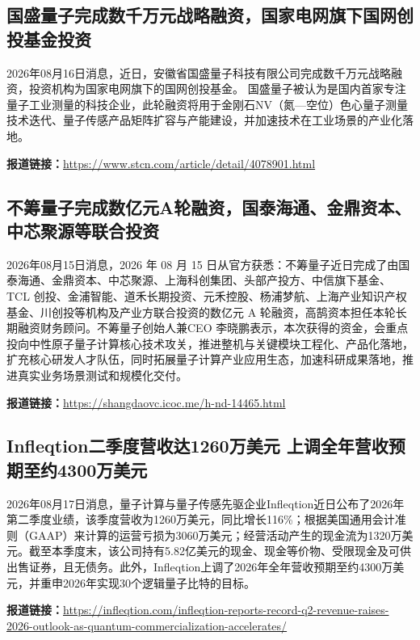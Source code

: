 \documentclass[12pt,a4paper]{ctexart}
\begin{document}
\subsection{ 国盛量子完成数千万元战略融资，国家电网旗下国网创投基金投资 }

2026年08月16日消息，近日，安徽省国盛量子科技有限公司完成数千万元战略融资，投资机构为国家电网旗下的国网创投基金。 国盛量子被认为是国内首家专注量子工业测量的科技企业，此轮融资将用于金刚石NV（氮—空位）色心量子测量技术迭代、量子传感产品矩阵扩容与产能建设，并加速技术在工业场景的产业化落地。

\noindent\textbf{报道链接：}\url{https://www.stcn.com/article/detail/4078901.html}

\subsection{ 不筹量子完成数亿元A轮融资，国泰海通、金鼎资本、中芯聚源等联合投资 }

2026年08月15日消息，2026 年 08 月 15 日从官方获悉：不筹量子近日完成了由国泰海通、金鼎资本、中芯聚源、上海科创集团、头部产投方、中信旗下基金、TCL 创投、金浦智能、道禾长期投资、元禾控股、杨浦梦航、上海产业知识产权基金、川创投等机构及产业方联合投资的数亿元 A 轮融资，高鹄资本担任本轮长期融资财务顾问。不筹量子创始人兼CEO 李晓鹏表示，本次获得的资金，会重点投向中性原子量子计算核心技术攻关，推进整机与关键模块工程化、产品化落地，扩充核心研发人才队伍，同时拓展量子计算产业应用生态，加速科研成果落地，推进真实业务场景测试和规模化交付。

\noindent\textbf{报道链接：}\url{https://shangdaovc.icoc.me/h-nd-14465.html}

\subsection{ Infleqtion二季度营收达1260万美元 上调全年营收预期至约4300万美元 }

2026年08月17日消息，量子计算与量子传感先驱企业Infleqtion近日公布了2026年第二季度业绩，该季度营收为1260万美元，同比增长116\%；根据美国通用会计准则（GAAP）来计算的运营亏损为3060万美元；经营活动产生的现金流为1320万美元。截至本季度末，该公司持有5.82亿美元的现金、现金等价物、受限现金及可供出售证券，且无债务。此外，Infleqtion上调了2026年全年营收预期至约4300万美元，并重申2026年实现30个逻辑量子比特的目标。

\noindent\textbf{报道链接：}\url{https://infleqtion.com/infleqtion-reports-record-q2-revenue-raises-2026-outlook-as-quantum-commercialization-accelerates/}
\end{document}

